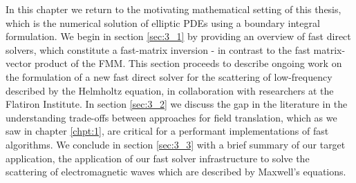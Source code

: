 In this chapter we return to the motivating mathematical setting of this thesis, which is the numerical solution of elliptic PDEs using a boundary integral formulation. We begin in section \ref{sec:3_1} by providing an overview of fast direct solvers, which constitute a fast-matrix inversion - in contrast to the fast matrix-vector product of the FMM. This section proceeds to describe ongoing work on the formulation of a new fast direct solver for the scattering of low-frequency described by the Helmholtz equation, in collaboration with researchers at the Flatiron Institute. In section \ref{sec:3_2} we discuss the gap in the literature in the understanding trade-offs between approaches for field translation, which as we saw in chapter \ref{chpt:1}, are critical for a performant implementations of fast algorithms. We conclude in section \ref{sec:3_3} with a brief summary of our target application, the application of our fast solver infrastructure to solve the scattering of electromagnetic waves which are described by Maxwell's equations.

